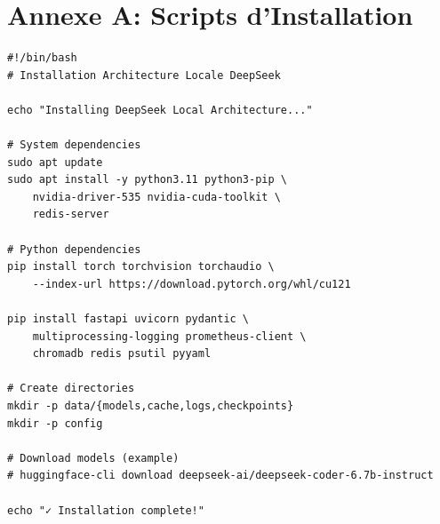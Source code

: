 \documentclass[12pt,a4paper]{article}
\begin{document}
\vspace{1cm}

\begin{center}
\end{center}

\appendix

\section{Annexe A: Scripts d'Installation}

\begin{lstlisting}[caption={install\_local.sh}]
#!/bin/bash
# Installation Architecture Locale DeepSeek

echo "Installing DeepSeek Local Architecture..."

# System dependencies
sudo apt update
sudo apt install -y python3.11 python3-pip \
    nvidia-driver-535 nvidia-cuda-toolkit \
    redis-server

# Python dependencies
pip install torch torchvision torchaudio \
    --index-url https://download.pytorch.org/whl/cu121
    
pip install fastapi uvicorn pydantic \
    multiprocessing-logging prometheus-client \
    chromadb redis psutil pyyaml

# Create directories
mkdir -p data/{models,cache,logs,checkpoints}
mkdir -p config

# Download models (example)
# huggingface-cli download deepseek-ai/deepseek-coder-6.7b-instruct

echo "✓ Installation complete!"
\end{lstlisting}
\end{document}
